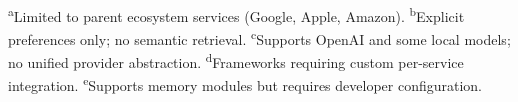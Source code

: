 \begin{table}[H]
\centering
\caption{Qualitative comparison of OpenPA against baseline systems}
\label{tab:qualitative}
\vspace{0.5em}

\footnotesize{%
\textsuperscript{a}Limited to parent ecosystem services (Google, Apple, Amazon).
\textsuperscript{b}Explicit preferences only; no semantic retrieval.
\textsuperscript{c}Supports OpenAI and some local models; no unified provider abstraction.
\textsuperscript{d}Frameworks requiring custom per-service integration.
\textsuperscript{e}Supports memory modules but requires developer configuration.
}
\end{table}


